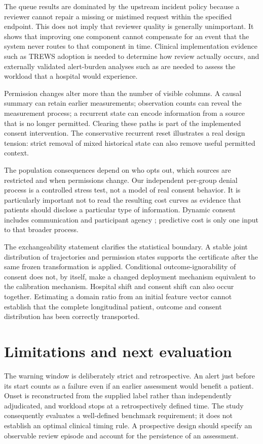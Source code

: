 The queue results are dominated by the upstream incident policy because a reviewer cannot repair a missing or mistimed request within the specified endpoint. This does not imply that reviewer quality is generally unimportant. It shows that improving one component cannot compensate for an event that the system never routes to that component in time. Clinical implementation evidence such as TREWS adoption \citep{trews} is needed to determine how review actually occurs, and externally validated alert-burden analyses such as \citet{wong2021} are needed to assess the workload that a hospital would experience.

Permission changes alter more than the number of visible columns. A causal summary can retain earlier measurements; observation counts can reveal the measurement process; a recurrent state can encode information from a source that is no longer permitted. Clearing these paths is part of the implemented consent intervention. The conservative recurrent reset illustrates a real design tension: strict removal of mixed historical state can also remove useful permitted context.

The population consequences depend on who opts out, which sources are restricted and when permissions change. Our independent per-group denial process is a controlled stress test, not a model of real consent behavior. It is particularly important not to read the resulting cost curves as evidence that patients should disclose a particular type of information. Dynamic consent includes communication and participant agency \citep{kaye2014}; predictive cost is only one input to that broader process.

The exchangeability statement clarifies the statistical boundary. A stable joint distribution of trajectories and permission states supports the certificate after the same frozen transformation is applied. Conditional outcome-ignorability of consent does not, by itself, make a changed deployment mechanism equivalent to the calibration mechanism. Hospital shift and consent shift can also occur together. Estimating a domain ratio from an initial feature vector cannot establish that the complete longitudinal patient, outcome and consent distribution has been correctly transported.

\section*{Limitations and next evaluation}
The warning window is deliberately strict and retrospective. An alert just before its start counts as a failure even if an earlier assessment would benefit a patient. Onset is reconstructed from the supplied label rather than independently adjudicated, and workload stops at a retrospectively defined time. The study consequently evaluates a well-defined benchmark requirement; it does not establish an optimal clinical timing rule. A prospective design should specify an observable review episode and account for the persistence of an assessment.

